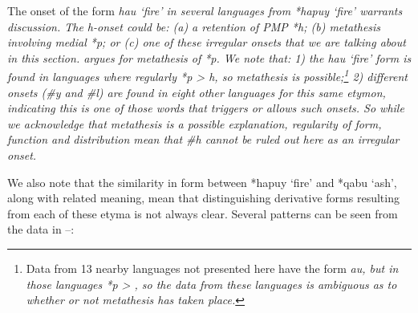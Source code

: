The onset of the form \it{hau} ‘fire’ in several languages from
*hapuy ‘fire’ warrants discussion.
The \it{h}-onset could be: (a) a retention of PMP *h; (b) metathesis
involving medial *p; or (c) one of these irregular onsets that
we are talking about in this section.
\citet[115, 118]{Collins1983} argues for metathesis of *p.
We note that: 1) the \it{hau} ‘fire’ form is found in languages
where regularly *p > \it{h},
so metathesis is possible;\footnote{
		Data from 13 nearby languages
		not presented here have the form \it{au},
		but in those languages *p > {\0},
		so the data from these languages is ambiguous as to whether or
		not metathesis has taken place.}
2) different onsets
(\it{{\#}y} and \it{{\#}l}) are found in eight other languages for this same
etymon, indicating this is one of those words that triggers or allows such onsets.
So while we acknowledge that metathesis is a possible explanation,
regularity of form, function
and distribution mean that \it{{\#}h} cannot be ruled out here
as an irregular onset.

We also note that the similarity in form between *hapuy ‘fire’
and *qabu ‘ash’, along with related meaning,
mean that distinguishing derivative forms resulting from each
of these etyma is not always clear.
Several patterns can be seen from the data in --:

